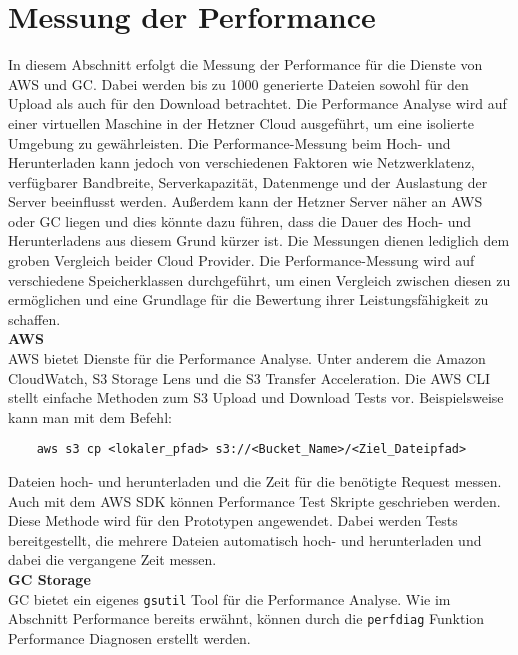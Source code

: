 \newpage

\section{Messung der Performance}

In diesem Abschnitt erfolgt die Messung der Performance für die Dienste von AWS und GC. Dabei werden bis zu 1000 generierte Dateien sowohl für den Upload als auch für den Download betrachtet. Die Performance Analyse wird auf einer virtuellen Maschine in der Hetzner Cloud ausgeführt, um eine isolierte Umgebung zu gewährleisten. Die Performance-Messung beim Hoch- und Herunterladen kann jedoch von verschiedenen Faktoren wie Netzwerklatenz, verfügbarer Bandbreite, Serverkapazität, Datenmenge und der Auslastung der Server beeinflusst werden. Außerdem kann der Hetzner Server näher an AWS oder GC liegen und dies könnte dazu führen, dass die Dauer des Hoch- und Herunterladens aus diesem Grund kürzer ist. Die Messungen dienen lediglich dem groben Vergleich beider Cloud Provider. Die Performance-Messung wird auf verschiedene Speicherklassen durchgeführt, um einen Vergleich zwischen diesen zu ermöglichen und eine Grundlage für die Bewertung ihrer Leistungsfähigkeit zu schaffen.\\

\textbf{AWS}\\

AWS bietet Dienste für die Performance Analyse. Unter anderem die Amazon CloudWatch, S3 Storage Lens und die S3 Transfer Acceleration. Die AWS CLI stellt einfache Methoden zum S3 Upload und Download Tests vor. Beispielsweise kann man mit dem Befehl:

\begin{lstlisting}
	aws s3 cp <lokaler_pfad> s3://<Bucket_Name>/<Ziel_Dateipfad>
\end{lstlisting}

Dateien hoch- und herunterladen und die Zeit für die benötigte Request messen. Auch mit dem AWS SDK können Performance Test Skripte geschrieben werden. Diese Methode wird für den Prototypen angewendet. Dabei werden Tests bereitgestellt, die mehrere Dateien automatisch hoch- und herunterladen und dabei die vergangene Zeit messen.\\ 

\textbf{GC Storage}\\

GC bietet ein eigenes \verb|gsutil| Tool für die Performance Analyse. Wie im Abschnitt Performance bereits erwähnt, können durch die \verb|perfdiag| Funktion Performance Diagnosen erstellt werden.\\ 

